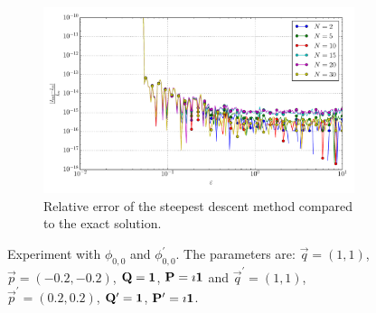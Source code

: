 \documentclass[a4paper,10pt]{article}
\begin{document}
\begin{figure}[ht!]
\begin{subfigure}[t]{0.5\linewidth}
    \includegraphics[width=\linewidth]{./plots/tp_2d_conv_eps_(0,0)_(0,0)_err_rel_nsd.pdf}
    \caption{Relative error of the steepest descent method compared to the exact solution.}
    \label{fig:tp_2d_conv_eps_00_00_err_rel_nsd}
  \end{subfigure}
  \label{fig:tp_2d_conv_eps_00_00}
  \caption{Experiment with $\phi_{0,0}$ and $\phi_{0,0}^{\prime}$.
  The parameters are:
  $\vec{q} = (1, 1)$,
  $\vec{p} = (-0.2, -0.2)$,
  $\mathbf{Q} = \mathbf{1}$,
  $\mathbf{P} = \imath \mathbf{1}$
  and
  $\vec{q}^\prime = (1, 1)$,
  $\vec{p}^\prime = (0.2, 0.2)$,
  $\mathbf{Q}^\prime = \mathbf{1}$,
  $\mathbf{P}^\prime = \imath \mathbf{1}$.}
\end{figure}
\end{document}
